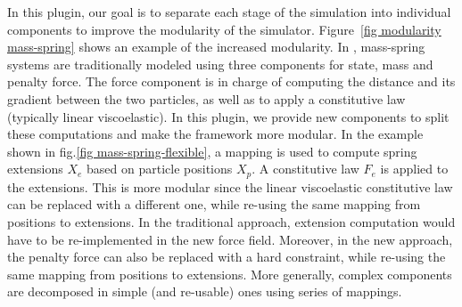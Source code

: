 In this plugin, our goal is to separate each stage of the simulation into individual components to improve the modularity of the simulator.
Figure~\ref{fig modularity mass-spring} shows an example of the increased modularity.
In \sofa{}, mass-spring systems are traditionally modeled using three components for  state, mass and penalty force. 
The force component is in charge of computing the distance and its gradient between the two particles, as well as to apply a constitutive law (typically linear viscoelastic).
In this plugin, we provide new components to split these computations and make the framework more modular.
In the example shown in fig.\ref{fig mass-spring-flexible}, a mapping is used to compute spring extensions $X_e$ based on particle positions $X_p$. 
A constitutive law $F_e$ is applied to the extensions.
This is more modular since the linear viscoelastic constitutive law can be replaced with a different one, while re-using the same mapping from positions to extensions. In the traditional approach, extension computation would have to be re-implemented in the new force field.
Moreover, in the new approach, the penalty force can also be replaced with a hard constraint, while re-using the same mapping from positions to extensions.
More generally, complex components are decomposed in simple (and re-usable) ones using series of mappings.
